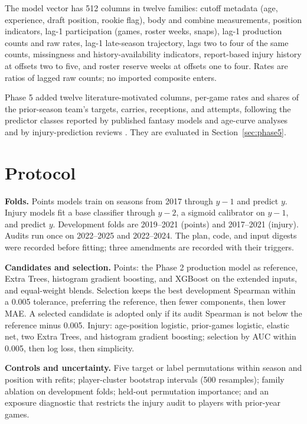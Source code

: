\documentclass[11pt]{article}
\begin{document}
The model vector has 512 columns in twelve families: cutoff metadata (age, experience, draft position, rookie flag), body and combine measurements, position indicators, lag-1 participation (games, roster weeks, snaps), lag-1 production counts and raw rates, lag-1 late-season trajectory, lags two to four of the same counts, missingness and history-availability indicators, report-based injury history at offsets two to five, and roster reserve weeks at offsets one to four. Rates are ratios of lagged raw counts; no imported composite enters.

Phase 5 added twelve literature-motivated columns, per-game rates and shares of the prior-season team's targets, carries, receptions, and attempts, following the predictor classes reported by published fantasy models and age-curve analyses \citep{smu2019,fourforfour2025,footballguys} and by injury-prediction reviews \citep{scoping2025}. They are evaluated in Section~\ref{sec:phase5}.

\section{Protocol}

\textbf{Folds.} Points models train on seasons from 2017 through $y-1$ and predict $y$. Injury models fit a base classifier through $y-2$, a sigmoid calibrator on $y-1$, and predict $y$. Development folds are 2019--2021 (points) and 2017--2021 (injury). Audits run once on 2022--2025 and 2022--2024. The plan, code, and input digests were recorded before fitting; three amendments are recorded with their triggers.

\textbf{Candidates and selection.} Points: the Phase 2 production model as reference, Extra Trees, histogram gradient boosting, and XGBoost on the extended inputs, and equal-weight blends. Selection keeps the best development Spearman within a 0.005 tolerance, preferring the reference, then fewer components, then lower MAE. A selected candidate is adopted only if its audit Spearman is not below the reference minus 0.005. Injury: age-position logistic, prior-games logistic, elastic net, two Extra Trees, and histogram gradient boosting; selection by AUC within 0.005, then log loss, then simplicity.

\textbf{Controls and uncertainty.} Five target or label permutations within season and position with refits; player-cluster bootstrap intervals (500 resamples); family ablation on development folds; held-out permutation importance; and an exposure diagnostic that restricts the injury audit to players with prior-year games.
\end{document}

